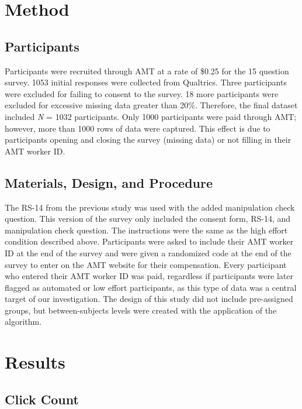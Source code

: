 \documentclass[english,man]{apa6}
\theoremstyle{definition}
\theoremstyle{definition}
\theoremstyle{definition}
\theoremstyle{remark}
\begin{document}
\section{Method}\label{method-2}

\subsection{Participants}\label{participants-1}

Participants were recruited through AMT at a rate of \$0.25 for the 15
question survey. 1053 initial responses were collected from Qualtrics.
Three participants were excluded for failing to consent to the survey.
18 more participants were excluded for excessive missing data greater
than 20\%. Therefore, the final dataset included \emph{N} = 1032
participants. Only 1000 participants were paid through AMT; however,
more than 1000 rows of data were captured. This effect is due to
participants opening and closing the survey (missing data) or not
filling in their AMT worker ID.

\subsection{Materials, Design, and
Procedure}\label{materials-design-and-procedure}

The RS-14 from the previous study was used with the added manipulation
check question. This version of the survey only included the consent
form, RS-14, and manipulation check question. The instructions were the
same as the high effort condition described above. Participants were
asked to include their AMT worker ID at the end of the survey and were
given a randomized code at the end of the survey to enter on the AMT
website for their compensation. Every participant who entered their AMT
worker ID was paid, regardless if participants were later flagged as
automated or low effort participants, as this type of data was a central
target of our investigation. The design of this study did not include
pre-assigned groups, but between-subjects levels were created with the
application of the algorithm.

\section{Results}\label{results-2}

\subsection{Click Count}\label{click-count-2}
\end{document}
